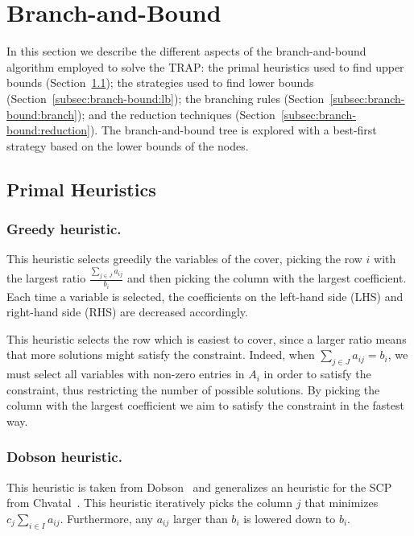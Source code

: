 \documentclass[runningheads]{llncs}
\begin{document}
\section{Branch-and-Bound}
\label{sec:branch-bound}

In this section we describe the different aspects of the branch-and-bound algorithm employed to solve the TRAP: the primal heuristics used to find upper bounds (Section~\ref{subsec:branch-bound:primal}); the strategies used to find lower bounds (Section~\ref{subsec:branch-bound:lb}); the branching rules (Section~\ref{subsec:branch-bound:branch}); and the reduction techniques (Section~\ref{subsec:branch-bound:reduction}). The branch-and-bound tree is explored with a best-first strategy based on the lower bounds of the nodes.

\subsection{Primal Heuristics}
\label{subsec:branch-bound:primal}

\subsubsection{Greedy heuristic.} This heuristic selects greedily the variables of the cover, picking the row $i$ with the largest ratio $\frac{\sum_{j \in J} a_{ij}}{b_i}$ and then picking the column with the largest coefficient. Each time a variable is selected, the coefficients on the left-hand side (LHS) and right-hand side (RHS) are decreased accordingly.

This heuristic selects the row which is easiest to cover, since a larger ratio means that more solutions might satisfy the constraint. Indeed, when $\sum_{j \in J} a_{ij} = b_i$, we must select all variables with non-zero entries in $A_i$ in order to satisfy the constraint, thus restricting the number of possible solutions. By picking the column with the largest coefficient we aim to satisfy the constraint in the fastest way.

\subsubsection{Dobson heuristic.} This heuristic is taken from Dobson~\cite{dobson-1982-worst-case} and generalizes an heuristic for the SCP from Chvatal~\cite{chvatal-1979-greedy}. This heuristic iteratively picks the column $j$ that minimizes $c_j \sum_{i \in I} a_{ij}$. Furthermore, any $a_{ij}$ larger than $b_i$ is lowered down to $b_i$.
\end{document}
